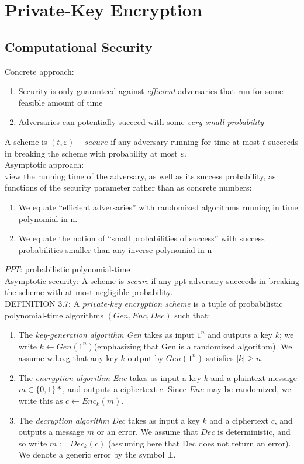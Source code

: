 \section{Private-Key Encryption}
\subsection*{Computational Security}
Concrete approach:
\begin{enumerate}
    \item Security is only guaranteed against \emph{efficient} 
    adversaries that run for some feasible amount of time
    \item Adversaries can potentially succeed
     with some \emph{very small probability}
\end{enumerate}

A scheme is $(t,\varepsilon)-secure$ if any adversary running for time at most
 $t$ succeeds in breaking the scheme with probability at most $\varepsilon$.\\

 Asymptotic approach:\\
view the running time of the adversary, as well as its success probability, 
 as functions of the security parameter rather than as concrete numbers:
 \begin{enumerate}
     \item We equate “efficient adversaries” with randomized 
     algorithms running in time polynomial in n.
     \item We equate the notion of “small probabilities of success” 
     with success probabilities smaller than any inverse polynomial in n
 \end{enumerate}
 $PPT$: probabilistic polynomial-time\\
 Asymptotic security: A scheme is \emph{secure} if any ppt adversary succeeds
  in breaking the scheme with at most negligible probability.\\

  DEFINITION 3.7: A \emph{private-key encryption scheme} is a tuple of 
  probabilistic polynomial-time algorithms $(Gen, Enc, Dec)$ such that:
  \begin{enumerate}
      \item The \emph{key-generation algorithm Gen} takes as input $1^n$ and outputs
       a key $k$; we write $k \leftarrow Gen(1^n)$(emphasizing that Gen 
       is a randomized algorithm). We assume w.l.o.g that any
        key $k$ output by $Gen(1^n)$ satisfies $|k| \ge n$.
        \item The \emph{encryption algorithm Enc} takes as input a key $k$ and a plaintext
        message $m \in \{0,1\}\ast$, and outputs a ciphertext $c$. Since $Enc$
        may be randomized, we write this as $c \leftarrow Enc_k(m)$.
        \item The \emph{decryption algorithm Dec} takes as input a key $k$ and a ciphertext
        $c$, and outputs a message $m$ or an error. We assume that $Dec$ is 
        deterministic, and so write $m := Dec_k(c)$ 
        (assuming here that Dec does not return an error). 
        We denote a generic error by the symbol $\bot $.
  \end{enumerate}

